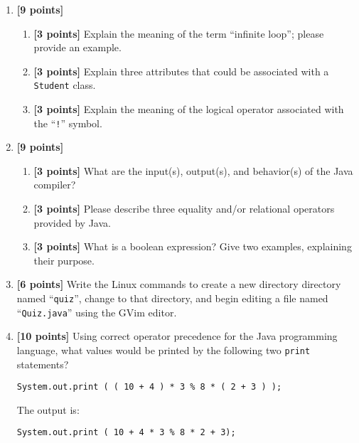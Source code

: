 \begin{enumerate}
\item {\bf [9 points]}
\begin{enumerate}
\item {\bf [3 points]} 
Explain the meaning of the term ``infinite loop''; please provide an example.
\bigskip
\bigskip
\bigskip
\item {\bf [3 points]} 
Explain three attributes that could be associated with a {\tt Student} class.
\bigskip
\bigskip
\bigskip
\bigskip
\item {\bf [3 points]} 
  Explain the meaning of the logical operator associated with the ``{\tt !}'' symbol.
\bigskip
\bigskip
\bigskip
\bigskip
\end{enumerate}
\item {\bf [9 points]}
\begin{enumerate}
\item {\bf [3 points]} 
  What are the input(s), output(s), and behavior(s) of the Java compiler?
\bigskip
\bigskip
\bigskip
\bigskip
\item {\bf [3 points]} 
Please describe three equality and/or relational operators provided by Java.
\bigskip
\bigskip
\bigskip
\bigskip
\item {\bf [3 points]} 
What is a boolean expression? Give two examples, explaining their purpose.
\end{enumerate}
\bigskip
\bigskip
\bigskip
\bigskip

\item {\bf [6 points]}
Write the Linux commands to create a new directory directory named ``{\tt quiz}'',
change to that directory, and begin editing a file named ``{\tt Quiz.java}'' using
the GVim editor.

\vspace{2in}

\item {\bf[10 points]} Using correct operator precedence for the Java programming language, what values would be printed
  by the following two {\tt print} statements?

\begin{verbatim}
System.out.print ( ( 10 + 4 ) * 3 % 8 * ( 2 + 3 ) ); 		
\end{verbatim}

\vspace*{-.175in}
The output is: \mbox{\underline{\hspace{3in}}}

\begin{verbatim}
System.out.print ( 10 + 4 * 3 % 8 * 2 + 3);				    
\end{verbatim}	


\end{enumerate}
